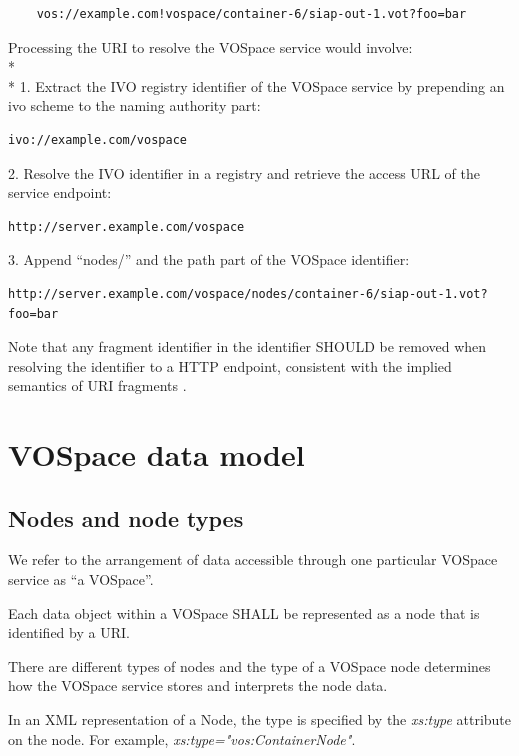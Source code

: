 \documentclass[11pt,a4paper]{ivoa}
\begin{document}
\begin{verbatim}
    vos://example.com!vospace/container-6/siap-out-1.vot?foo=bar
\end{verbatim}

\noindent
Processing the URI to resolve the VOSpace service would involve:
\\* \\*
1.  Extract the IVO registry identifier of the VOSpace service by prepending an ivo scheme to the naming authority part:
\begin{verbatim}
ivo://example.com/vospace
\end{verbatim}
2.  Resolve the IVO identifier in a registry and retrieve the access URL of the service endpoint:
\begin{verbatim}
http://server.example.com/vospace
\end{verbatim}
3.  Append ``nodes/'' and the path part of the VOSpace identifier:
\begin{verbatim}
http://server.example.com/vospace/nodes/container-6/siap-out-1.vot?foo=bar
\end{verbatim}

Note that any fragment identifier in the identifier SHOULD be removed when resolving the identifier to a HTTP endpoint, consistent with the implied semantics of URI fragments \citep{note:uriforms}.

\section{VOSpace data model}
\label{sec:vospace data model}

\subsection{Nodes and node types}
\label{subsec:nodes and node types}

We refer to the arrangement of data accessible through one particular VOSpace service as ``a VOSpace''.

Each data object within a VOSpace SHALL be represented as a node that is identified by a URI.

There are different types of nodes and the type of a VOSpace node determines how the VOSpace service stores and interprets the node data.

In an XML representation of a Node, the type is specified by the \emph{xs:type} attribute on the node.  For example, \emph{xs:type="vos:ContainerNode"}.
\end{document}
